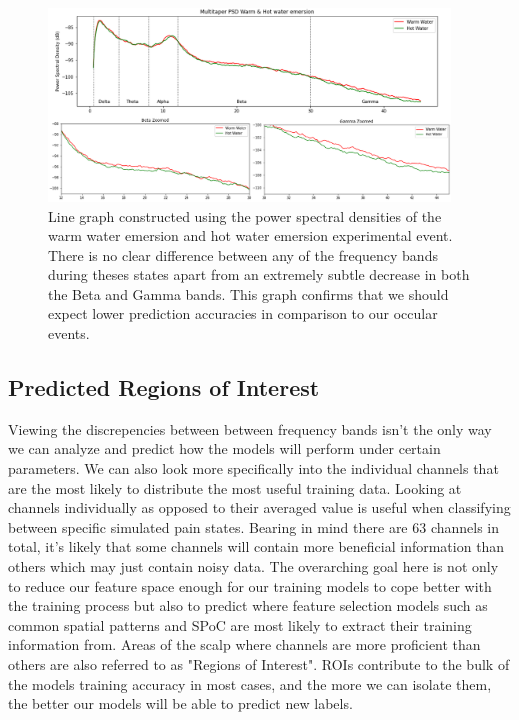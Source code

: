 \documentclass[11pt]{article}
\begin{document}
\begin{figure}[tb]
\centering
\includegraphics[width=0.95\textwidth]{1.png}
\caption{\label{fig:Chart_Pain}
Line graph constructed using the power spectral densities of the warm water emersion and hot water emersion experimental event. There is no clear difference between any of the frequency bands during theses states apart from an extremely subtle decrease in both the Beta and Gamma bands. This graph confirms that we should expect lower prediction accuracies in comparison to our occular events.}
\end{figure} 

\subsection{Predicted Regions of Interest}

Viewing the discrepencies between between frequency bands isn't the only way we can analyze and predict how the models will perform under certain parameters. We can also look more specifically into the individual channels that are the most likely to distribute the most useful training data. Looking at channels individually as opposed to their averaged value is useful when classifying between specific simulated pain states. Bearing in mind there are 63 channels in total, it's likely that some channels will contain more beneficial information than others which may just contain noisy data. The overarching goal here is not only to reduce our feature space enough for our training models to cope better with the training process but also to predict where feature selection models such as common spatial patterns and SPoC are most likely to extract their training information from. Areas of the scalp where channels are more proficient than others are also referred to as "Regions of Interest". ROIs contribute to the bulk of the models training accuracy in most cases, and the more we can isolate them, the better our models will be able to predict new labels.
\end{document}
